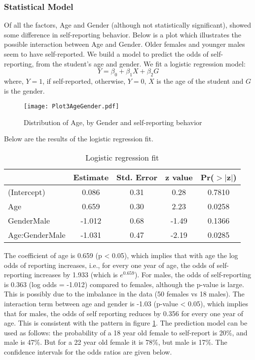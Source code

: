\documentclass[11]{article}
\begin{document}
\subsubsection*{Statistical Model}
Of all the factors, Age and Gender (although not statistically significant), showed some difference in self-reporting behavior. Below is a plot which illustrates the possible interaction between Age and Gender. Older females and younger males seem to have self-reported. We build a model to predict the odds of self-reporting, from the student's age and gender. We fit a logistic regression model:
\begin{equation}
Y = \beta_0 + \beta_1 X + \beta_2 G
\label{eq:Eq1}
\end{equation}
where, $Y = 1$, if self-reported, otherwise, $Y=0$, $X$ is the age of the student and $G$ is the gender. 


\begin{figure}[H]
\centering
\texttt{[image: Plot3AgeGender.pdf]}
\caption{Distribution of Age, by Gender and self-reporting behavior}
\label{fig:Fig3AgeGender}
\end{figure}
Below are the results of the logistic regression fit.
\begin{table}[H]
\centering
\begin{tabular}{lcccc}
  \hline
 & Estimate & Std. Error & z value & Pr($>$$|$z$|$) \\ 
  \hline
(Intercept) & 0.086 & 0.31 & 0.28 & 0.7810 \\ 
  Age & 0.659 & 0.30 & 2.23 & 0.0258 \\ 
  GenderMale & -1.012 & 0.68 & -1.49 & 0.1366 \\ 
  Age:GenderMale & -1.031 & 0.47 & -2.19 & 0.0285 \\ 
   \hline
\end{tabular}
\caption{Logistic regression fit} 
\label{tab:Tab8Model}
\end{table}The coefficient of age is 0.659 (p < 0.05), which implies that with age the log odds of reporting increases, i.e., for every one year of age, the odds of self-reporting increases by 1.933 (which is $e^{0.659}$). For males, the odds of self-reporting is 0.363 (log odds = -1.012) compared to females, although the p-value is large. This is possibly due to the imbalance in the data (50 females vs 18 males). The interaction term between age and gender is -1.03 (p-value < 0.05), which implies that for males, the odds of self reporting reduces by 0.356 for every one year of age. This is consistent with the pattern in figure \ref{fig:Fig3AgeGender}. The prediction model can be used as follows: the probability of a 18 year old female to self-report is 20\%, and male is 47\%. But for a 22 year old female it is 78\%, but male is 17\%. The confidence intervals for the odds ratios are given below.
\end{document}
